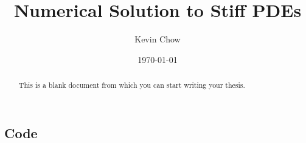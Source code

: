 \documentclass[draft]{sfuthesis}
\title{Numerical Solution to Stiff PDEs}
\author{Kevin Chow}
\date{\today}
\theoremstyle{plain}
\theoremstyle{definition}
\theoremstyle{remark}
\begin{document}
\frontmatter
\maketitle{}
\makecommittee{}

\begin{abstract}
	This is a blank document from which you can start writing your thesis.
\end{abstract}


\begin{dedication} %
\end{dedication}


\begin{acknowledgements} %
\end{acknowledgements}

\tableofcontents\clearpage
{}\listoftables\clearpage
{}\listoffigures





%
%

\mainmatter%











%
%
%
%
%

\backmatter%
	
	

\begin{appendices} %
	\chapter{Code}
\end{appendices}
\end{document}
